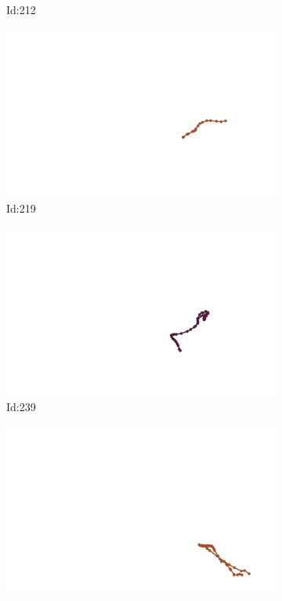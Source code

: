 \documentclass[12pt,twoside]{report}
\begin{document}
\begin{figure}
\begin{subfigure}[b]{0.20\textwidth}
\caption{Id:212}
\end{subfigure}
\begin{subfigure}[b]{0.20\textwidth}
\centering
\includegraphics[width=\textwidth]{../trajectories/219.png}
\caption{Id:219}
\end{subfigure}
\begin{subfigure}[b]{0.20\textwidth}
\centering
\includegraphics[width=\textwidth]{../trajectories/239.png}
\caption{Id:239}
\end{subfigure}
\begin{subfigure}[b]{0.20\textwidth}
\centering
\includegraphics[width=\textwidth]{../trajectories/240.png}

\end{subfigure}
\end{figure}
\end{document}
